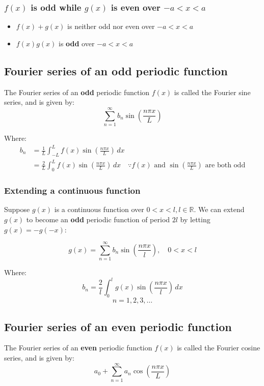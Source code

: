 \documentclass[11pt]{article}
\begin{document}
\subsubsection{\(f(x)\) is odd while \(g(x)\) is even over \(- a < x < a\)}
\label{sec:orgce172d1}
\begin{itemize}
\item \(f(x) + g(x)\) is neither odd nor even over \(- a < x < a\)
\item \(f(x) g(x)\) is \textbf{odd} over \(- a < x < a\)
\end{itemize}

 \newpage

\subsection{Fourier series of an odd periodic function}
\label{sec:orgf735b9b}
The Fourier series of an \textbf{odd} periodic function \(f(x)\) is called the Fourier sine series, and is given by:
\[\sum_{n = 1}^{\infty} b_n \sin \left( \frac{n \pi x}{L} \right)\]

Where:
\begin{align*}
b_n &= \frac{1}{L} \int_{-L}^{L} f(x) \sin \left( \frac{n \pi x}{L} \right) \, dx \\
&= \frac{2}{L} \int_0^L f(x) \sin \left( \frac{n \pi x}{L} \right) \, dx \quad \because f(x) \text{ and } \sin \left( \frac{n \pi x}{L} \right) \text{ are both odd}
\end{align*}

\subsubsection{Extending a continuous function}
\label{sec:org5175f9c}
Suppose \(g(x)\) is a continuous function over \(0 < x < l, l \in \mathbb{R}\). We can extend \(g(x)\) to become an \textbf{odd} periodic function of period \(2l\) by letting \(g(x) = - g(-x)\):

\[g(x) = \sum_{n = 1}^{\infty} b_n \sin \left( \frac{n \pi x}{l} \right), \quad 0 < x < l\]

Where:
\[b_n = \frac{2}{l} \int_0^l g(x) \sin \left( \frac{n \pi x}{l} \right) \, dx\]
\[n = 1, 2, 3, \ldots\]

 \newpage

\subsection{Fourier series of an even periodic function}
\label{sec:org483497e}
The Fourier series of an \textbf{even} periodic function \(f(x)\) is called the Fourier cosine series, and is given by:
\[a_0 + \sum_{n = 1}^{\infty} a_n \cos \left( \frac{n \pi x}{L} \right)\]
\end{document}
